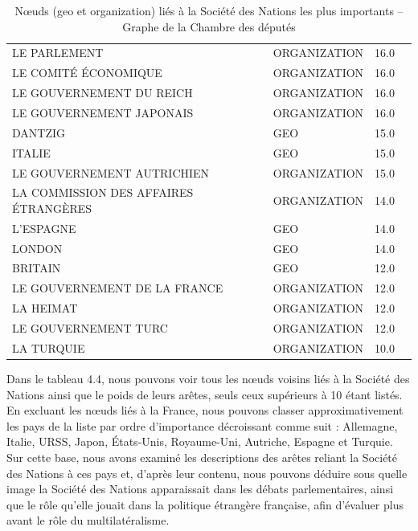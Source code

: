 \documentclass[a4paper,twoside,12pt]{book}
\begin{document}
\begin{table}[htbp]
\begin{tabular}{ll@{\hskip 1cm}ll}
LE PARLEMENT & ORGANIZATION & 16.0 \\
LE COMITÉ ÉCONOMIQUE & ORGANIZATION & 16.0 \\
LE GOUVERNEMENT DU REICH & ORGANIZATION & 16.0 \\
LE GOUVERNEMENT JAPONAIS & ORGANIZATION & 16.0 \\
DANTZIG & GEO & 15.0 \\
ITALIE & GEO & 15.0 \\
LE GOUVERNEMENT AUTRICHIEN & ORGANIZATION & 15.0 \\
LA COMMISSION DES AFFAIRES ÉTRANGÈRES & ORGANIZATION & 14.0 \\
L'ESPAGNE & GEO & 14.0 \\
LONDON & GEO & 14.0 \\
BRITAIN & GEO & 12.0 \\
LE GOUVERNEMENT DE LA FRANCE & ORGANIZATION & 12.0 \\
LA HEIMAT & ORGANIZATION & 12.0 \\
LE GOUVERNEMENT TURC & ORGANIZATION & 12.0 \\
LA TURQUIE & ORGANIZATION & 10.0 \\
\hline
\end{tabular}
\caption{Nœuds (geo et organization) liés à la Société des Nations les plus importants – Graphe de la Chambre des députés}
\end{table}

Dans le tableau 4.4, nous pouvons voir tous les nœuds voisins liés à la Société des Nations ainsi que le poids de leurs arêtes, seuls ceux supérieurs à 10 étant listés. En excluant les nœuds liés à la France, nous pouvons classer approximativement les pays de la liste par ordre d'importance décroissant comme suit : Allemagne, Italie, URSS, Japon, États-Unis, Royaume-Uni, Autriche, Espagne et Turquie. Sur cette base, nous avons examiné les descriptions des arêtes reliant la Société des Nations à ces pays et, d'après leur contenu, nous pouvons déduire sous quelle image la Société des Nations apparaissait dans les débats parlementaires, ainsi que le rôle qu'elle jouait dans la politique étrangère française, afin d'évaluer plus avant le rôle du multilatéralisme.
\end{document}
